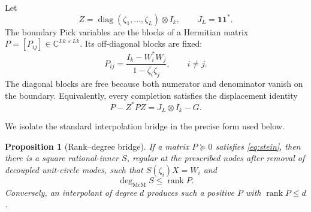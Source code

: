 \documentclass[11pt]{article}
\newtheorem{proposition}[theorem]{Proposition}
\theoremstyle{definition}
\theoremstyle{remark}
\newcommand{\C}{\mathbb C}
\newcommand{\rank}{\operatorname{rank}}
\newcommand{\diag}{\operatorname{diag}}
\newcommand{\mcdeg}{\deg_{\mathrm{McM}}}
\newcommand{\one}{\mathbf 1}
\begin{document}
Let
\[
 Z=\diag(\zeta_1,\ldots,\zeta_L)\otimes I_k,
 \qquad J_L=\one\one^*.
\]
The boundary Pick variables are the blocks of a Hermitian matrix
$P=[P_{ij}]\in\C^{Lk\times Lk}$.  Its off-diagonal blocks are fixed:
\begin{equation}\label{eq:pick-offdiag}
 P_{ij}=\frac{I_k-W_i^*W_j}{1-\overline{\zeta_i}\zeta_j},
 \qquad i\ne j.
\end{equation}
The diagonal blocks are free because both numerator and denominator vanish
on the boundary.  Equivalently, every completion satisfies the displacement
identity
\begin{equation}\label{eq:stein}
                 P-Z^*PZ=J_L\otimes I_k-G.
\end{equation}

We isolate the standard interpolation bridge in the precise form used below.

\begin{proposition}[Rank--degree bridge]\label{prop:bridge}
If a matrix $P\succeq0$ satisfies \eqref{eq:stein}, then there is a square
rational-inner $S$, regular at the prescribed nodes after removal of
decoupled unit-circle modes, such that
$S(\zeta_i)X=W_i$ and
\[
                           \mcdeg S\le\rank P.
\]
Conversely, an interpolant of degree $d$ produces such a positive $P$ with
$\rank P\le d$.
\end{proposition}
\end{document}

